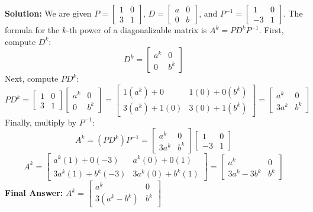\documentclass[11pt, a4paper]{article}
\theoremstyle{definition}
\theoremstyle{remark}
\begin{document}
\textbf{Solution:}
We are given $P = \begin{bmatrix} 1 & 0 \\ 3 & 1 \end{bmatrix}$, $D = \begin{bmatrix} a & 0 \\ 0 & b \end{bmatrix}$, and $P^{-1} = \begin{bmatrix} 1 & 0 \\ -3 & 1 \end{bmatrix}$.
The formula for the $k$-th power of a diagonalizable matrix is $A^k = PD^kP^{-1}$.
First, compute $D^k$:
\[
D^k = \begin{bmatrix} a^k & 0 \\ 0 & b^k \end{bmatrix}
\]
Next, compute $PD^k$:
\[
PD^k = \begin{bmatrix} 1 & 0 \\ 3 & 1 \end{bmatrix} \begin{bmatrix} a^k & 0 \\ 0 & b^k \end{bmatrix} = \begin{bmatrix} 1(a^k) + 0 & 1(0) + 0(b^k) \\ 3(a^k) + 1(0) & 3(0) + 1(b^k) \end{bmatrix} = \begin{bmatrix} a^k & 0 \\ 3a^k & b^k \end{bmatrix}
\]
Finally, multiply by $P^{-1}$:
\[
A^k = (PD^k)P^{-1} = \begin{bmatrix} a^k & 0 \\ 3a^k & b^k \end{bmatrix} \begin{bmatrix} 1 & 0 \\ -3 & 1 \end{bmatrix}
\]
\[
A^k = \begin{bmatrix} a^k(1) + 0(-3) & a^k(0) + 0(1) \\ 3a^k(1) + b^k(-3) & 3a^k(0) + b^k(1) \end{bmatrix} = \begin{bmatrix} a^k & 0 \\ 3a^k - 3b^k & b^k \end{bmatrix}
\]
\textbf{Final Answer:} $\displaystyle A^k = \begin{bmatrix} a^k & 0 \\ 3(a^k - b^k) & b^k \end{bmatrix}$
\end{document}
